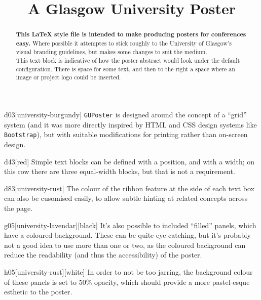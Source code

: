 \documentclass{guposter}
\title{A Glasgow University Poster}
\begin{document}
\maketitle

 
\begin{abstract}
  \textrm{\textbf{This \LaTeX{} style file is intended to make producing
      posters for conferences easy.} Where possible it attemptes to
    stick roughly to the University of Glasgow's visual branding
    guidelines, but makes some changes to suit the medium.\\[2em]
    This text block is indicative of how the poster abstract would look
    under the default configuration. There is space for some text, and
    then to the right a space where an image or project logo could be
    inserted.  }
\end{abstract}

 \begin{panel}{d0}{3}[university-burgundy]
   {\Large \texttt{GUPoster} is designed around the concept of a ``grid''
     system (and it was more directly inspired by HTML and CSS design
     systems like \texttt{Bootstrap}), but with suitable modifications
     for printing rather than on-screen design. }
 \end{panel}

 \begin{panel}{d4}{3}[red]
   {\Large Simple text blocks can be defined with a position, and with
     a width; on this row there are three equal-width blocks, but that
     is not a requirement.}
 \end{panel}

 \begin{panel}{d8}{3}[university-rust]
   {\Large The colour of the ribbon feature at the side of each text
     box can also be cusomised easily, to allow subtle hinting at
     related concepts across the page.}
 \end{panel}
 
 \begin{fillpanel}{g0}{5}[university-lavendar][black]
   It's also possible to included ``filled'' panels, which have a
   coloured background. These can be quite eye-catching, but it's
   probably not a good idea to use more than one or two, as the
   coloured background can reduce the readability (and thus the
   accessibility) of the poster.
 \end{fillpanel}

  \begin{fillpanel}{h0}{5}[university-rust][white]
   In order to not be too jarring, the background colour of these
   panels is set to 50\% opacity, which should provide a more
   pastel-esque esthetic to the poster.
  \end{fillpanel}
  
\end{document}
